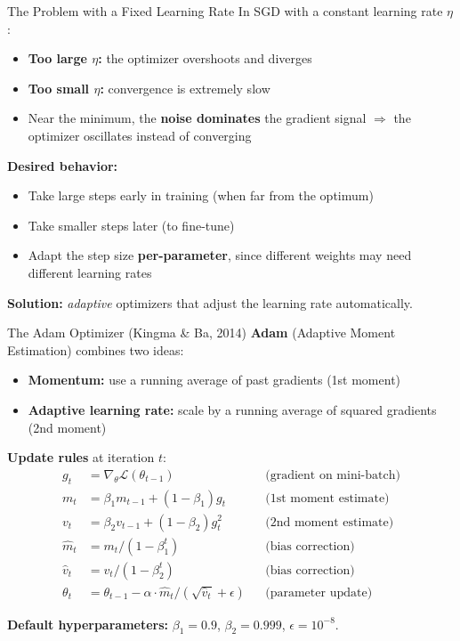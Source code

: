 \documentclass[aspectratio=169]{beamer}
\begin{document}
%
%
\begin{frame}{The Problem with a Fixed Learning Rate}
\small
In SGD with a constant learning rate $\eta$:

\begin{itemize}
    \item \textbf{Too large $\eta$:} the optimizer overshoots and diverges
    \item \textbf{Too small $\eta$:} convergence is extremely slow
    \item Near the minimum, the \textbf{noise dominates} the gradient signal $\Rightarrow$ the optimizer oscillates instead of converging
\end{itemize}

\vspace{0.3cm}
\textbf{Desired behavior:}
\begin{itemize}
    \item Take large steps early in training (when far from the optimum)
    \item Take smaller steps later (to fine-tune)
    \item Adapt the step size \textbf{per-parameter}, since different weights may need different learning rates
\end{itemize}

\vspace{0.3cm}
\textbf{Solution:} \emph{adaptive} optimizers that adjust the learning rate automatically.
\end{frame}
%
%
\begin{frame}{The Adam Optimizer (Kingma \& Ba, 2014)}
\small
\textbf{Adam} (Adaptive Moment Estimation) combines two ideas:
\begin{itemize}
    \item \textbf{Momentum:} use a running average of past gradients (1st moment)
    \item \textbf{Adaptive learning rate:} scale by a running average of squared gradients (2nd moment)
\end{itemize}

\medskip
\textbf{Update rules} at iteration $t$:
\begin{align*}
g_t &= \nabla_\theta \mathcal{L}(\theta_{t-1}) && \text{(gradient on mini-batch)}\\
m_t &= \beta_1 m_{t-1} + (1 - \beta_1) g_t && \text{(1st moment estimate)}\\
v_t &= \beta_2 v_{t-1} + (1 - \beta_2) g_t^2 && \text{(2nd moment estimate)}\\
\hat{m}_t &= m_t / (1 - \beta_1^t) && \text{(bias correction)}\\
\hat{v}_t &= v_t / (1 - \beta_2^t) && \text{(bias correction)}\\
\theta_t &= \theta_{t-1} - \alpha \cdot \hat{m}_t / (\sqrt{\hat{v}_t} + \epsilon) && \text{(parameter update)}
\end{align*}

\medskip
\textbf{Default hyperparameters:} $\beta_1 = 0.9$, $\beta_2 = 0.999$, $\epsilon = 10^{-8}$.
\end{frame}
\end{document}
